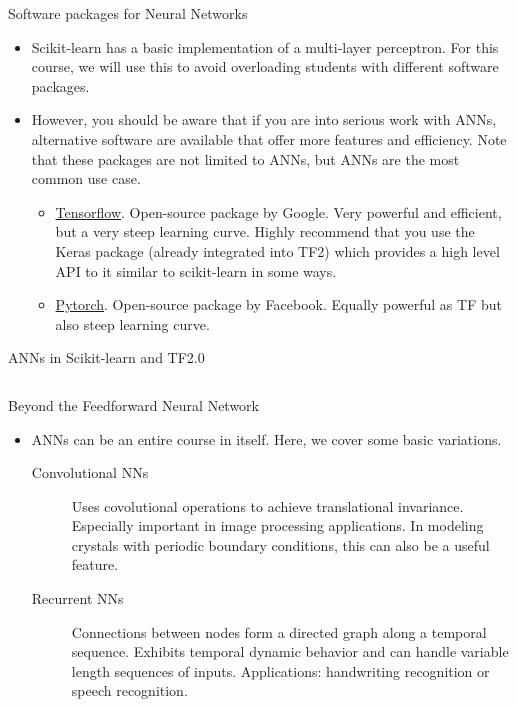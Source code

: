 \documentclass[aspectratio=169]{beamer}
\begin{document}
\begin{frame}{Software packages for Neural Networks}
    \begin{itemize}
        \item Scikit-learn has a basic implementation of a multi-layer perceptron. For this course, we will use this to avoid overloading students with different software packages.
        \item However, you should be aware that if you are into serious work with ANNs, alternative software are available that offer more features and efficiency. Note that these packages are not limited to ANNs, but ANNs are the most common use case.
        \begin{itemize}
            \item \href{https://www.tensorflow.org/}{Tensorflow}. Open-source package by Google. Very powerful and efficient, but a very steep learning curve. Highly recommend that you use the Keras package (already integrated into TF2) which provides a high level API to it similar to scikit-learn in some ways.
            \item \href{https://pytorch.org/}{Pytorch}. Open-source package by Facebook. Equally powerful as TF but also steep learning curve.
        \end{itemize}
    \end{itemize}
\end{frame}


\begin{frame}[fragile]{ANNs in Scikit-learn and TF2.0}
\inputminted{python}{example_sklearn_tf_neural_network.py}
\end{frame}


\begin{frame}{Beyond the Feedforward Neural Network}
    \begin{itemize}
        \item ANNs can be an entire course in itself. Here, we cover some basic variations.
        \begin{description}
        \item[Convolutional NNs] Uses covolutional operations to achieve translational invariance. Especially important in image processing applications. In modeling crystals with periodic boundary conditions, this can also be a useful feature.
        \item[Recurrent NNs] Connections between nodes form a directed graph along a temporal sequence. Exhibits temporal dynamic behavior and can handle variable length sequences of inputs. Applications: handwriting recognition or speech recognition.
        \end{description}
        
    \end{itemize}
\end{frame}
\end{document}
